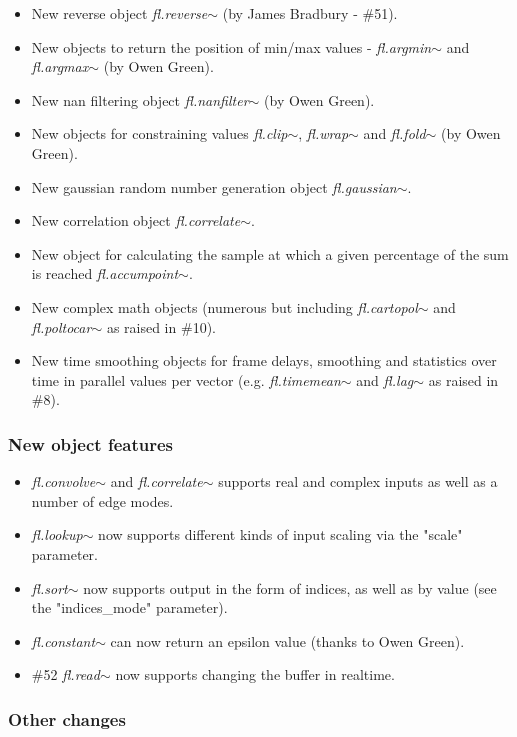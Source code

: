 \documentclass{article}
\newcommand{\flobject}[1]{\textit{fl.#1$\sim$}}
\begin{document}
\begin{itemize}
\item New reverse object \flobject{reverse} (by James Bradbury - {\#51}).
\item New objects to return the position of min/max values - \flobject{argmin} and \flobject{argmax} (by Owen Green).
\item New nan filtering object \flobject{nanfilter} (by Owen Green).
\item New objects for constraining values \flobject{clip}, \flobject{wrap} and \flobject{fold} (by Owen Green).
\item New gaussian random number generation object \flobject{gaussian}.
\item New correlation object \flobject{correlate}.
\item New object for calculating the sample at which a given percentage of the sum is reached \flobject{accumpoint}.
\item New complex math objects (numerous but including \flobject{cartopol} and \flobject{poltocar} as raised in {\#10}).
\item New time smoothing objects for frame delays, smoothing and statistics over time in parallel values per vector (e.g. \flobject{timemean} and \flobject{lag} as raised in {\#8}).
\end{itemize}

\subsubsection{New object features}

\begin{itemize}
\item \flobject{convolve} and  \flobject{correlate} supports real and complex inputs as well as a number of edge modes.
\item \flobject{lookup} now supports different kinds of input scaling via the "scale" parameter.
\item \flobject{sort} now supports output in the form of indices, as well as by value (see the "indices\_mode" parameter).
\item \flobject{constant} can now return an epsilon value (thanks to Owen Green).
\item {\#52} \flobject{read} now supports changing the buffer in realtime.
\end{itemize}

\subsubsection{Other changes}
\end{document}
